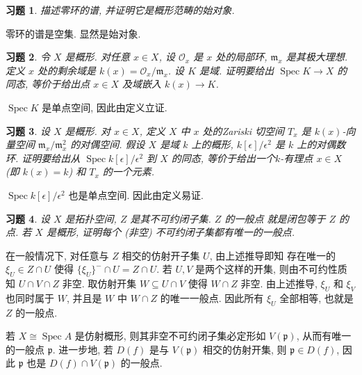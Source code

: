 \documentclass{article}
\theoremstyle{exercise}
\newtheorem{exercise}{习题}[section]
\newenvironment{proofc}{\proof}{\endproof}
\def\gp{\mathfrak{p}}
\def\gm{\mathfrak{m}}
\def\cO{\mathscr{O}}
\def\Spec{\operatorname{Spec}}
\begin{document}
\begin{exercise}
  描述零环的谱, 并证明它是概形范畴的始对象.
\end{exercise}

\begin{proofc}
  零环的谱是空集. 显然是始对象.
\end{proofc}

\begin{exercise}
  令 $X$ 是概形. 对任意 $x \in X$, 设 $\cO_x$ 是 $x$ 处的局部环,
  $\gm_x$ 是其极大理想. 定义 $x$ 处的\emph{剩余域}是 $k(x) = \cO_x / \gm_x$.
  设 $K$ 是域. 证明要给出 $\Spec K \to X$ 的同态, 等价于给出点 $x \in X$
  及域嵌入 $k(x) \to K$.
\end{exercise}

\begin{proofc}
  $\Spec K$ 是单点空间, 因此由定义立证.
\end{proofc}

\begin{exercise}
  设 $X$ 是概形. 对 $x \in X$, 定义 $X$ 中 $x$ 处的\emph{Zariski 切空间} $T_x$
  是 $k(x)$-向量空间 $\gm_x / \gm_x^2$ 的对偶空间.
  假设 $X$ 是域 $k$ 上的概形, $k[\epsilon] / \epsilon^2$ 是 $k$ 上的\emph{对偶数环}.
  证明要给出从 $\Spec k[\epsilon]/\epsilon^2$ 到 $X$ 的同态,
  等价于给出一个\emph{$k$-有理点} $x \in X$ (即 $k(x) = k$) 和 $T_x$ 的一个元素.
\end{exercise}

\begin{proofc}
  $\Spec k[\epsilon] / \epsilon^2$ 也是单点空间. 因此由定义易证.
\end{proofc}

\begin{exercise}
  设 $X$ 是拓扑空间, $Z$ 是其不可约闭子集. $Z$ 的\emph{一般点} 就是闭包等于 $Z$ 的点.
  若 $X$ 是概形, 证明每个 (非空) 不可约闭子集都有唯一的一般点.
\end{exercise}

\begin{proofc}
  在一般情况下, 对任意与 $Z$ 相交的仿射开子集 $U$, 由上述推导即知
  存在唯一的 $\xi_U \in Z \cap U$ 使得 $\{ \xi_U \}^- \cap U = Z \cap U$.
  若 $U, V$ 是两个这样的开集, 则由不可约性质知 $U \cap V \cap Z$ 非空.
  取仿射开集 $W \subseteq U \cap V$ 使得 $W \cap Z$ 非空.
  由上述推导, $\xi_U$ 和 $\xi_V$ 也同时属于 $W$, 并且是 $W$ 中 $W \cap Z$ 的唯一一般点.
  因此所有 $\xi_U$ 全部相等, 也就是 $Z$ 的一般点.

  若 $X \cong \Spec A$ 是仿射概形, 则其非空不可约闭子集必定形如 $V(\gp)$,
  从而有唯一的一般点 $\gp$.
  进一步地, 若 $D(f)$ 是与 $V(\gp)$ 相交的仿射开集, 则 $\gp \in D(f)$,
  因此 $\gp$ 也是 $D(f) \cap V(\gp)$ 的一般点.
\end{proofc}
\end{document}
